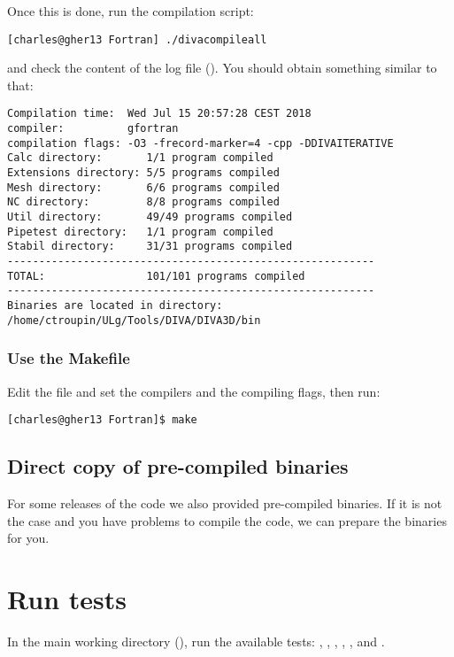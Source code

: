Once this is done, run the compilation script: 
\begin{lstlisting}[style=Bash]
[charles@gher13 Fortran] ./divacompileall
\end{lstlisting}
and check the content of the log file (). You should obtain something similar to that:
\begin{verbatim}
Compilation time:  Wed Jul 15 20:57:28 CEST 2018
compiler:          gfortran
compilation flags: -O3 -frecord-marker=4 -cpp -DDIVAITERATIVE
Calc directory:       1/1 program compiled
Extensions directory: 5/5 programs compiled
Mesh directory:       6/6 programs compiled
NC directory:         8/8 programs compiled
Util directory:       49/49 programs compiled
Pipetest directory:   1/1 program compiled
Stabil directory:     31/31 programs compiled
----------------------------------------------------------
TOTAL:                101/101 programs compiled
----------------------------------------------------------
Binaries are located in directory:
/home/ctroupin/ULg/Tools/DIVA/DIVA3D/bin

\end{verbatim}

\subsubsection{Use the Makefile}

Edit the file  and set the compilers and the compiling flags, then run:

\begin{lstlisting}[style=Bash]
[charles@gher13 Fortran]$ make
\end{lstlisting}

\subsection{Direct copy of pre-compiled binaries}

For some releases of the code we also provided pre-compiled binaries. If it is not the case and you have problems to compile the code, we can prepare the binaries for you.

\section{Run tests\label{sec:divatest}}

In the main working directory (), run the available tests: 
, , , , ,  and .


